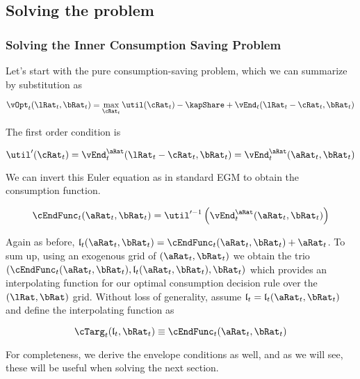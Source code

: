 \documentclass[\econtexRoot/SequentialEGM]{subfiles}
\begin{document}
\subsection{Solving the problem}

\subsubsection{Solving the Inner Consumption Saving Problem}

Let's start with the pure consumption-saving problem, which we can summarize by
substitution as

\begin{equation}
  \vOpt_{t}(\lRat_{t}, \bRat_{t}) = \max_{\cRat_{t}} \util(\cRat_{t}) - \kapShare +
  \vEnd_{t}(\lRat_{t} - \cRat_{t}, \bRat_{t})
\end{equation}

The first order condition is

\begin{equation}
  \util'(\cRat_{t}) = \vEnd_{t}^{\aRat}(\lRat_{t}-\cRat_{t}, \bRat_{t}) =
  \vEnd_{t}^{\aRat}(\aRat_{t}, \bRat_{t})
\end{equation}

We can invert this Euler equation as in standard EGM to obtain the consumption
function.

\begin{equation}
  \cEndFunc_{t}(\aRat_{t}, \bRat_{t}) =
  \util'^{-1}\left(\vEnd_{t}^{\aRat}(\aRat_{t}, \bRat_{t})\right)
\end{equation}

\providecommand{\lEndFunc}{\ensuremath{\mathfrak{l}}}

Again as before, $\lEndFunc_{t}(\aRat_{t}, \bRat_{t}) =
  \cEndFunc_{t}(\aRat_{t}, \bRat_{t}) + \aRat_{t}$. To sum up, using an
exogenous
grid of $(\aRat_{t}, \bRat_{t})$ we obtain the trio $(\cEndFunc_{t}(\aRat_{t},
  \bRat_{t}), \lEndFunc_{t}(\aRat_{t},
  \bRat_{t}), \bRat_{t})$ which
provides an
interpolating function for our optimal consumption decision rule over the
$(\lRat, \bRat)$ grid. Without loss of generality, assume $\lEndFunc_{t} =
  \lEndFunc_{t}(\aRat_{t}, \bRat_{t})$ and define the interpolating
function as

\begin{equation}
  \cTarg_{t}(\lEndFunc_{t}, \bRat_{t}) \equiv \cEndFunc_{t}(\aRat_{t},
  \bRat_{t})
\end{equation}

For completeness, we derive the envelope conditions as well, and as we will
see, these will be useful when solving the next section.
\end{document}
